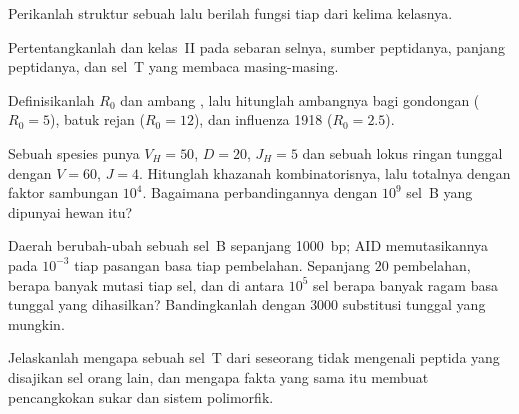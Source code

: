 \begin{exercise}[$\star$]\label{exo:b3:adaptive-immunity:2}
Perikanlah struktur sebuah  lalu berilah fungsi tiap dari kelima
kelasnya.
\end{exercise}

\begin{exercise}[$\star$]\label{exo:b3:adaptive-immunity:3}
Pertentangkanlah  dan kelas~II pada sebaran selnya, sumber
peptidanya, panjang peptidanya, dan sel~T yang membaca masing-masing.
\end{exercise}

\begin{exercise}[$\star$]\label{exo:b3:adaptive-immunity:4}
Definisikanlah $R_{0}$ dan ambang , lalu hitunglah
ambangnya bagi gondongan ($R_{0} = 5$), batuk rejan ($R_{0} = 12$), dan
influenza 1918 ($R_{0} = 2.5$).
\end{exercise}

\begin{exercise}[$\star\star$]\label{exo:b3:adaptive-immunity:5}
Sebuah spesies punya $V_{H} = 50$, $D = 20$, $J_{H} = 5$ dan sebuah lokus
ringan tunggal dengan $V = 60$, $J = 4$. Hitunglah khazanah kombinatorisnya, lalu
totalnya dengan faktor sambungan $10^{4}$. Bagaimana perbandingannya
dengan $10^{9}$ sel~B yang dipunyai hewan itu?
\end{exercise}

\begin{exercise}[$\star\star$]\label{exo:b3:adaptive-immunity:6}
Daerah berubah-ubah sebuah sel~B  sepanjang \qty{1000}{bp}; AID
memutasikannya pada $10^{-3}$ tiap pasangan basa tiap pembelahan. Sepanjang $20$
pembelahan, berapa banyak mutasi tiap sel, dan di antara $10^{5}$ sel berapa
banyak ragam basa tunggal  yang dihasilkan? Bandingkanlah dengan
$3000$ substitusi tunggal yang mungkin.
\end{exercise}

\begin{exercise}[$\star\star$]\label{exo:b3:adaptive-immunity:7}
Jelaskanlah mengapa sebuah sel~T dari seseorang tidak mengenali peptida 
yang disajikan sel orang lain, dan mengapa fakta yang sama itu membuat
pencangkokan sukar dan sistem  polimorfik.
\end{exercise}

